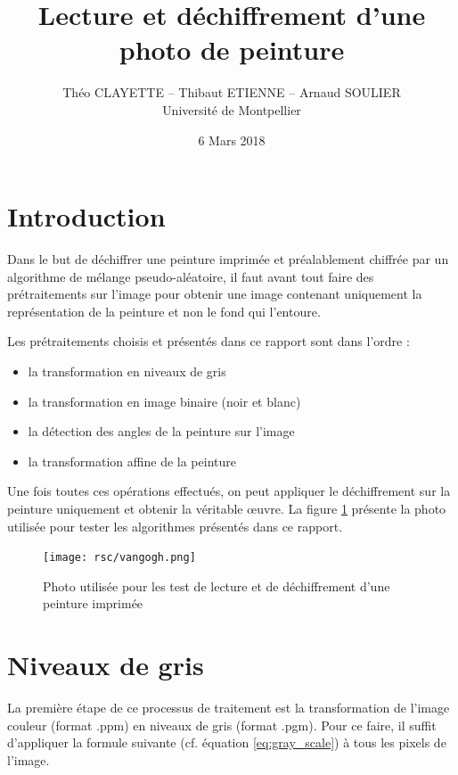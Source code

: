 \documentclass[a4paper]{article}
\title{Lecture et déchiffrement d'une photo de peinture}
\author{Théo CLAYETTE -- Thibaut ETIENNE -- Arnaud SOULIER\\Université de Montpellier}
\date{6 Mars 2018}
\begin{document}
    \maketitle

    \newpage

    \section{Introduction}

        Dans le but de déchiffrer une peinture imprimée et préalablement chiffrée par un algorithme de mélange pseudo-aléatoire, il faut avant tout faire des prétraitements sur l'image pour obtenir une image contenant uniquement la représentation de la peinture et non le fond qui l'entoure.

        Les prétraitements choisis et présentés dans ce rapport sont dans l'ordre :
        \begin{itemize}
            \item la transformation en niveaux de gris
            \item la transformation en image binaire (noir et blanc)
            \item la détection des angles de la peinture sur l'image
            \item la transformation affine de la peinture
        \end{itemize}

        Une fois toutes ces opérations effectués, on peut appliquer le déchiffrement sur la peinture uniquement et obtenir la véritable \oe{}uvre. La figure \ref{fig:original} présente la photo utilisée pour tester les algorithmes présentés dans ce rapport.

        \begin{figure}[htbp]
            \begin{center}
                \texttt{[image: rsc/vangogh.png]}
                \caption{Photo utilisée pour les test de lecture et de déchiffrement d'une peinture imprimée}
                \label{fig:original}
            \end{center}
        \end{figure}

    \section{Niveaux de gris}

        La première étape de ce processus de traitement est la transformation de l'image couleur (format .ppm) en niveaux de gris (format .pgm). Pour ce faire, il suffit d'appliquer la formule suivante (cf. équation \ref{eq:gray_scale}) à tous les pixels de l'image.
\end{document}
